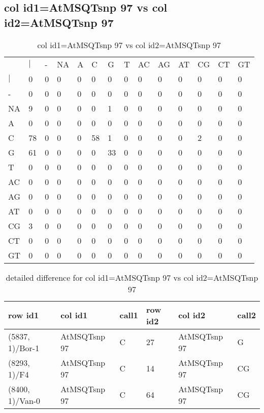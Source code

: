 \subsection{col id1=AtMSQTsnp 97 vs col id2=AtMSQTsnp 97}
\begin{center}
\begin{longtable}{|l|l|l|l|l|l|l|l|l|l|l|l|l|l|}
\caption{col id1=AtMSQTsnp 97 vs col id2=AtMSQTsnp 97} \label{table_dm790}\\
\hline
\\
\hline
&$|$&-&NA&A&C&G&T&AC&AG&AT&CG&CT&GT\\
$|$&0&0&0&0&0&0&0&0&0&0&0&0&0\\
-&0&0&0&0&0&0&0&0&0&0&0&0&0\\
NA&9&0&0&0&0&1&0&0&0&0&0&0&0\\
A&0&0&0&0&0&0&0&0&0&0&0&0&0\\
C&78&0&0&0&58&1&0&0&0&0&2&0&0\\
G&61&0&0&0&0&33&0&0&0&0&0&0&0\\
T&0&0&0&0&0&0&0&0&0&0&0&0&0\\
AC&0&0&0&0&0&0&0&0&0&0&0&0&0\\
AG&0&0&0&0&0&0&0&0&0&0&0&0&0\\
AT&0&0&0&0&0&0&0&0&0&0&0&0&0\\
CG&3&0&0&0&0&0&0&0&0&0&0&0&0\\
CT&0&0&0&0&0&0&0&0&0&0&0&0&0\\
GT&0&0&0&0&0&0&0&0&0&0&0&0&0\\
\hline
\end{longtable}
\end{center}

\begin{center}
\begin{longtable}{|l|l|l|l|l|l|}
\caption{detailed difference for col id1=AtMSQTsnp 97 vs col id2=AtMSQTsnp 97} \label{table_dm791}\\
\hline
row id1&col id1&call1&row id2&col id2&call2\\
\hline
(5837, 1)/Bor-1&AtMSQTsnp 97&C&27&AtMSQTsnp 97&G\\
(8293, 1)/F4&AtMSQTsnp 97&C&14&AtMSQTsnp 97&CG\\
(8400, 1)/Van-0&AtMSQTsnp 97&C&64&AtMSQTsnp 97&CG\\
\hline
\end{longtable}
\end{center}

